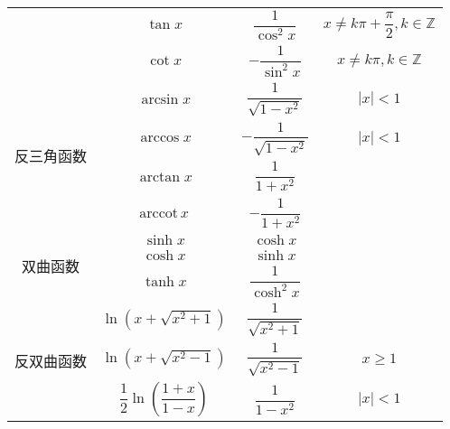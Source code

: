\begin{table}
\begin{tabular}{|c|c|c|c|}
                                    & $\tan x$                                            & $\dfrac{1}{\cos^{2}x}$       & $x \ne k\pi + \dfrac{\pi}{2}, k\in \mathbb{Z}$ \\
                                    & $\cot x$                                            & $-\dfrac{1}{\sin^{2}x}$      & $x \ne k\pi, k\in \mathbb{Z}$                  \\[5pt]
        \hline
        \multirow{4}{*}{反三角函数} & $\arcsin x$                                         & $\dfrac{1}{\sqrt{1 - x^2}}$  & $|x| < 1$                                      \\
                                    & $\arccos x$                                         & $-\dfrac{1}{\sqrt{1 - x^2}}$ & $|x| < 1$                                      \\
                                    & $\arctan x$                                         & $\dfrac{1}{1 + x^2}$         &                                                \\
                                    & $\mathrm{arccot}\, x$                               & $-\dfrac{1}{1 + x^2}$        &                                                \\[5pt]
        \hline
        \multirow{3}{*}{双曲函数}   & $\sinh x$                                           & $\cosh x$                    &                                                \\
                                    & $\cosh x$                                           & $\sinh x$                    &                                                \\
                                    & $\tanh x$                                           & $\dfrac{1}{\cosh^{2}x}$      &                                                \\[5pt]
        \hline
        \multirow{3}{*}{反双曲函数} & $\ln (x + \sqrt{x^2 + 1})$                          & $\dfrac{1}{\sqrt{x^2 + 1}}$  &                                                \\
                                    & $\ln (x + \sqrt{x^2 - 1})$                          & $\dfrac{1}{\sqrt{x^2 - 1}}$  & $x \geqslant 1$                                \\
                                    & $\dfrac{1}{2}\ln \left(\dfrac{1 + x}{1 - x}\right)$ & $\dfrac{1}{1 - x^2}$         & $|x| < 1$                                      \\[5pt]
        \hline
    \end{tabular}
\end{table}

